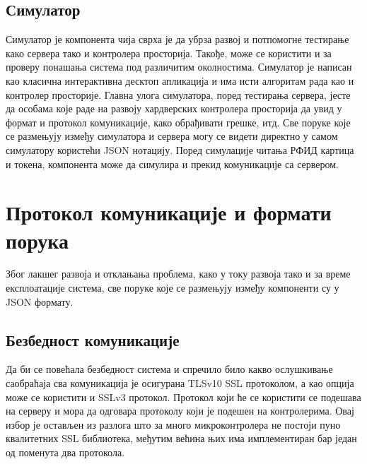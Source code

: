 \documentclass[a4paper, 12pt, diplomski]{etfcyr}
\begin{document}
			\subsection{Симулатор}
				\begin{justify}
					Симулатор је компонента чија сврха је да убрза развој и потпомогне тестирање како сервера тако и контролера просторија. Такође, може се користити и за проверу понашања система под различитим околностима. Симулатор је написан као класична интерактивна десктоп апликација и има исти алгоритам рада као и контролер просторије. Главна улога симулатора, поред тестирања сервера, јесте да особама које раде на развоју хардверских контролера просторија да увид у формат и протокол комуникације, како обрађивати грешке, итд. Све поруке које се размењују између симулатора и сервера могу се видети директно у самом симулатору користећи JSON нотацију. Поред симулације читања РФИД картица и токена, компонента може да симулира и прекид комуникације са сервером.
				\end{justify}

		\newpage

		\section{Протокол комуникације и формати порука}
			\begin{justify}
				Због лакшег развоја и отклањања проблема, како у току развоја тако и за време експлоатације система, све поруке које се размењују између компоненти су у JSON формату.
			\end{justify}

			\subsection{Безбедност комуникације}
				\begin{justify}
					Да би се повећала безбедност система и спречило било какво ослушкивање саобраћаја сва комуникација је осигурана TLSv10 SSL протоколом, а као опција може се користити и SSLv3 протокол. Протокол који ће се користити се подешава на серверу и мора да одговара протоколу који је подешен на контролерима. Овај избор је остављен из разлога што за много микроконтролера не постоји пуно квалитетних SSL библиотека, међутим већина њих има имплементиран бар један од поменута два протокола.
				\end{justify}
			
\end{document}
